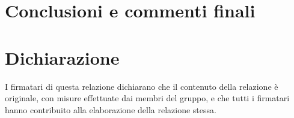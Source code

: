 \documentclass[10pt, a4paper, italian]{article}
\begin{document}
\section*{Conclusioni e commenti finali}


\section*{Dichiarazione}
I firmatari di questa relazione dichiarano che il contenuto della relazione \`e
originale, con misure effettuate dai membri del gruppo, e che tutti i firmatari
hanno contribuito alla elaborazione della relazione stessa.
\end{document}
